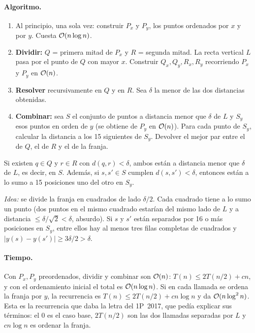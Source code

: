 \paragraph{Algoritmo.}
\begin{enumerate}
  \item Al principio, una sola vez: construir $P_x$ y $P_y$, los puntos ordenados por $x$ y por $y$. Cuesta $\mathcal{O}(n\log n)$.
  \item \textbf{Dividir:} $Q$ = primera mitad de $P_x$ y $R$ = segunda mitad. La recta vertical $L$ pasa por el punto de $Q$ con mayor $x$. Construir $Q_x,Q_y,R_x,R_y$ recorriendo $P_x$ y $P_y$ en $\mathcal{O}(n)$.
  \item \textbf{Resolver} recursivamente en $Q$ y en $R$. Sea $\delta$ la menor de las dos distancias obtenidas.
  \item \textbf{Combinar:} sea $S$ el conjunto de puntos a distancia menor que $\delta$ de $L$ y $S_y$ esos puntos en orden de $y$ (se obtiene de $P_y$ en $\mathcal{O}(n)$). Para cada punto de $S_y$, calcular la distancia a los 15 siguientes de $S_y$. Devolver el mejor par entre el de $Q$, el de $R$ y el de la franja.
\end{enumerate}

\begin{resultado}
Si existen $q\in Q$ y $r\in R$ con $d(q,r)<\delta$, ambos están a distancia menor que $\delta$ de $L$, es decir, en $S$. Además, si $s,s'\in S$ cumplen $d(s,s')<\delta$, entonces están a lo sumo a 15 posiciones uno del otro en $S_y$.

\emph{Idea:} se divide la franja en cuadrados de lado $\delta/2$. Cada cuadrado tiene a lo sumo un punto (dos puntos en el mismo cuadrado estarían del mismo lado de $L$ y a distancia $\le\delta/\sqrt2<\delta$, absurdo). Si $s$ y $s'$ están separados por 16 o más posiciones en $S_y$, entre ellos hay al menos tres filas completas de cuadrados y $|y(s)-y(s')|\ge 3\delta/2>\delta$.
\end{resultado}

\paragraph{Tiempo.} Con $P_x,P_y$ preordenados, dividir y combinar son $\mathcal{O}(n)$: $T(n)\le 2T(n/2)+cn$, y con el ordenamiento inicial el total es $\mathcal{O}(n\log n)$. Si en cada llamada se ordena la franja por $y$, la recurrencia es $T(n)\le 2T(n/2)+cn\log n$ y da $\mathcal{O}(n\log^2 n)$. Esta es la recurrencia que daba la letra del 1P~2017, que pedía explicar sus términos: el 0 es el caso base, $2T(n/2)$ son las dos llamadas separadas por $L$ y $cn\log n$ es ordenar la franja.

